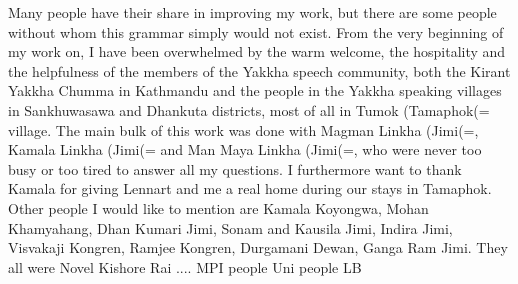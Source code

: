Many people have their share in improving my work, but there are some people without whom this grammar simply would not exist. From the very beginning of my work on, I have been overwhelmed by the warm welcome, the hospitality and the helpfulness of the members of the Yakkha speech community, both the Kirant Yakkha Chumma in Kathmandu and the people in  the Yakkha speaking villages in Sankhuwasawa and Dhankuta districts, most of all in Tumok (Tamaphok(= village. The main bulk of this work was done with Magman Linkha (Jimi(=, Kamala Linkha (Jimi(= and Man Maya Linkha (Jimi(=, who were never too busy or too tired to answer all my questions. I furthermore want to thank Kamala for giving Lennart and me a real home during our stays in Tamaphok. 
Other people I would like to mention are Kamala Koyongwa, Mohan Khamyahang, Dhan Kumari Jimi, Sonam and Kausila Jimi, Indira Jimi, Visvakaji Kongren, Ramjee Kongren, Durgamani Dewan, Ganga Ram Jimi. They all were
Novel Kishore Rai ....
MPI people Uni people
LB

 